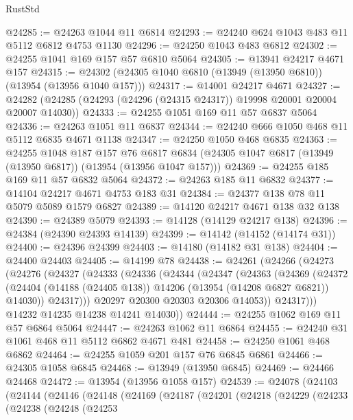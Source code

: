 \begin{lexlean}{RustStd}
\begin{coremodule}
@24285 := @24263 @1044 @11 @6814
@24293 := @24240 @624 @1043 @483 @11 @5112 @6812 @4753 @1130
@24296 := @24250 @1043 @483 @6812
@24302 := @24255 @1041 @169 @157 @57 @6810 @5064
@24305 := @13941 @24217 @4671 @157
@24315 := @24302 (@24305 @1040 @6810 (@13949 (@13950 @6810)) (@13954 (@13956 @1040 @157)))
@24317 := @14001 @24217 @4671
@24327 := @24282 (@24285 (@24293 (@24296 (@24315 @24317)) @19998 @20001 @20004 @20007 @14030))
@24333 := @24255 @1051 @169 @11 @57 @6837 @5064
@24336 := @24263 @1051 @11 @6837
@24344 := @24240 @666 @1050 @468 @11 @5112 @6835 @4671 @1138
@24347 := @24250 @1050 @468 @6835
@24363 := @24255
    @1048
    @187
    @157
    @76
    @6817
    @6834
    (@24305 @1047 @6817 (@13949 (@13950 @6817)) (@13954 (@13956 @1047 @157)))
@24369 := @24255 @185 @169 @11 @57 @6832 @5064
@24372 := @24263 @185 @11 @6832
@24377 := @14104 @24217 @4671 @4753 @183 @31
@24384 := @24377 @138 @78 @11 @5079 @5089 @1579 @6827
@24389 := @14120 @24217 @4671 @138 @32 @138
@24390 := @24389 @5079
@24393 := @14128 (@14129 @24217 @138)
@24396 := @24384 (@24390 @24393 @14139)
@24399 := @14142 (@14152 (@14174 @31))
@24400 := @24396 @24399
@24403 := @14180 (@14182 @31 @138)
@24404 := @24400 @24403
@24405 := @14199 @78
@24438 := @24261
    (@24266
      (@24273
        (@24276
          (@24327
            (@24333
              (@24336
                (@24344
                  (@24347
                    (@24363
                      (@24369
                        (@24372
                          (@24404
                            (@14188 (@24405 @138))
                            @14206
                            (@13954 (@14208 @6827 @6821))
                            @14030))
                        @24317)))
                  @20297
                  @20300
                  @20303
                  @20306
                  @14053))
              @24317)))
        @14232
        @14235
        @14238
        @14241
        @14030))
@24444 := @24255 @1062 @169 @11 @57 @6864 @5064
@24447 := @24263 @1062 @11 @6864
@24455 := @24240 @31 @1061 @468 @11 @5112 @6862 @4671 @481
@24458 := @24250 @1061 @468 @6862
@24464 := @24255 @1059 @201 @157 @76 @6845 @6861
@24466 := @24305 @1058 @6845
@24468 := @13949 (@13950 @6845)
@24469 := @24466 @24468
@24472 := @13954 (@13956 @1058 @157)
@24539 := @24078
    (@24103
      (@24144
        (@24146
          (@24148
            (@24169
              (@24187
                (@24201
                  (@24218
                    (@24229
                      (@24233
                        (@24238
                          (@24248
                            (@24253

\end{coremodule}
\end{lexlean}

